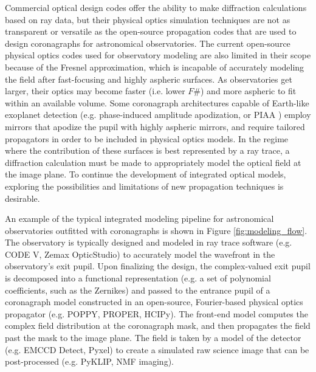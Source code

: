 Commercial optical design codes offer the ability to make diffraction calculations based on ray data, but their physical optics simulation techniques are not as transparent or versatile as the open-source propagation codes that are used to design coronagraphs for astronomical observatories. The current open-source physical optics codes used for observatory modeling are also limited in their scope because of the Fresnel approximation, which is incapable of accurately modeling the field after fast-focusing and highly aspheric surfaces\cite{krist_practical_2010,vanderbei_diffraction_2006}. As observatories get larger, their optics may become faster (i.e. lower $F\#$) and more aspheric to fit within an available volume. Some coronagraph architectures capable of Earth-like exoplanet detection (e.g. phase-induced amplitude apodization, or PIAA \cite{guyon_phase_nodate}) employ mirrors that apodize the pupil with highly aspheric mirrors, and require tailored propagators in order to be included in physical optics models\cite{krist_practical_2010}. In the regime where the contribution of these surfaces is best represented by a ray trace, a diffraction calculation must be made to appropriately model the optical field at the image plane. To continue the development of integrated optical models, exploring the possibilities and limitations of new propagation techniques is desirable.

An example of the typical integrated modeling pipeline for astronomical observatories outfitted with coronagraphs is shown in Figure \ref{fig:modeling_flow}. The observatory is typically designed and modeled in ray trace software (e.g. CODE V, Zemax OpticStudio) to accurately model the wavefront in the observatory's exit pupil. Upon finalizing the design, the complex-valued exit pupil is decomposed into a functional representation (e.g. a set of polynomial coefficients, such as the Zernikes\cite{krist_numerical_2015}) and passed to the entrance pupil of a coronagraph model constructed in an open-source, Fourier-based physical optics propagator (e.g. POPPY, PROPER, HCIPy). The front-end model computes the complex field distribution at the coronagraph mask, and then propagates the field past the mask to the image plane. The field is taken by a model of the detector (e.g. EMCCD Detect\cite{Nemati2023}, Pyxel\cite{Pyxel}) to create a simulated raw science image that can be post-processed (e.g. PyKLIP\cite{pyklip}, NMF imaging\cite{nmfimaging}).

